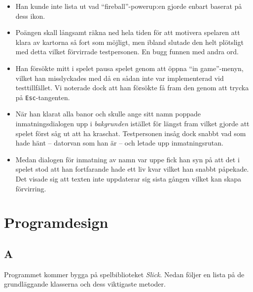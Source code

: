 \documentclass[11pt,a4paper]{article}
\begin{document}
\begin{itemize}
	\item Han kunde inte lista ut vad ``fireball''-powerup:en gjorde enbart baserat på dess ikon.
	\item Poängen skall långsamt räkna ned hela tiden för att motivera spelaren att klara av kartorna så fort som möjligt, men ibland slutade den helt plötsligt med detta vilket förvirrade testpersonen. En bugg funnen med andra ord.
	\item Han försökte mitt i spelet pausa spelet genom att öppna ``in game''-menyn, vilket han misslyckades med då en sådan inte var implementerad vid testtillfället. Vi noterade dock att han försökte få fram den genom att trycka på \texttt{Esc}-tangenten.
	\item När han klarat alla banor och skulle ange sitt namn poppade inmatningsdialogen upp i \emph{bakgrunden} istället för längst fram vilket gjorde att spelet först såg ut att ha kraschat. Testpersonen insåg dock snabbt vad som hade hänt -- datorvan som han är -- och letade upp inmatningsrutan.
	\item Medan dialogen för inmatning av namn var uppe fick han syn på att det i spelet stod att han fortfarande hade ett liv kvar vilket han snabbt påpekade. Det visade sig att texten inte uppdaterar sig sista gången vilket kan skapa förvirring.
\end{itemize}

\section{Programdesign}

\subsection{A}
Programmet kommer bygga på spelbiblioteket \emph{Slick}. Nedan följer en lista på de grundläggande klasserna och dess viktigaste metoder.
\end{document}
